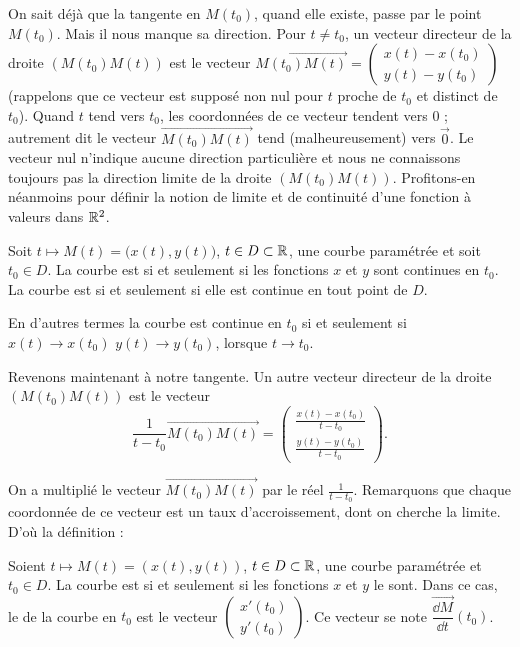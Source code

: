 \documentclass[class=report,crop=false]{standalone}
\begin{document}
On sait déjà que la tangente en $M(t_0)$, quand elle existe, passe
par le point $M(t_0)$. Mais il nous manque sa direction. Pour
$t\neq t_0$, un vecteur directeur de la droite $(M(t_0)M(t))$ est
le vecteur $\overrightarrow{M(t_0)M(t)}
=\left(\begin{smallmatrix}
x(t)-x(t_0)\\
y(t)-y(t_0)
\end{smallmatrix}\right)$
(rappelons que ce vecteur est supposé non nul pour $t$ proche
de $t_0$ et distinct de $t_0$). Quand $t$ tend vers $t_0$, les coordonnées
de ce vecteur tendent vers $0$ ; autrement dit le vecteur $\overrightarrow{M(t_0)M(t)}$
tend (malheureusement) vers $\overrightarrow{0}$. Le vecteur nul n'indique
aucune direction particulière et nous ne connaissons toujours pas la
direction limite de la droite $(M(t_0)M(t))$. Profitons-en néanmoins
pour définir la notion de limite et de continuité d'une fonction à valeurs dans $\mathbb{R}^2$.

\begin{definition}
Soit $t\mapsto M(t)=\big(x(t),y(t)\big)$, $t\in D\subset\mathbb{R}$, une courbe paramétrée
et soit $t_0\in D$.
La courbe est  si et seulement si les fonctions $x$ et
$y$ sont continues en $t_0$.
La courbe est  si et seulement si elle est continue en tout point de $D$.
\end{definition}


En d'autres termes la courbe est continue en $t_0$ si et seulement si
$x(t) \to x(t_0)$  $y(t) \to y(t_0)$, lorsque $t\to t_0$.



Revenons maintenant à notre tangente. Un autre vecteur directeur
de la droite $(M(t_0)M(t))$ est le vecteur
$$\frac{1}{t-t_0}\overrightarrow{M(t_0)M(t)}=\left(\begin{array}{c}
\frac{x(t)-x(t_0)}{t-t_0}\\
\frac{y(t)-y(t_0)}{t-t_0}
\end{array}
\right).$$

On a multiplié le vecteur $\overrightarrow{M(t_0)M(t)}$
par le réel $\frac{1}{t-t_0}$.
Remarquons que chaque coordonnée de ce vecteur est un taux d'accroissement,
dont on cherche la limite.
D'où la définition :

\begin{definition}
Soient $t\mapsto M(t)=(x(t),y(t))$, $t\in D\subset\mathbb{R}$, une courbe paramétrée
et $t_0\in D$. La courbe est  si et seulement si les fonctions
$x$ et $y$ le sont. Dans ce cas, le  de la courbe en $t_0$ est le vecteur
$\left(
\begin{matrix}
x'(t_0)\\
y'(t_0)
\end{matrix}
\right)$.
Ce vecteur se note $\overrightarrow{\dfrac{\dd M}{\dd t}}(t_0)$.
\end{definition}
\end{document}
